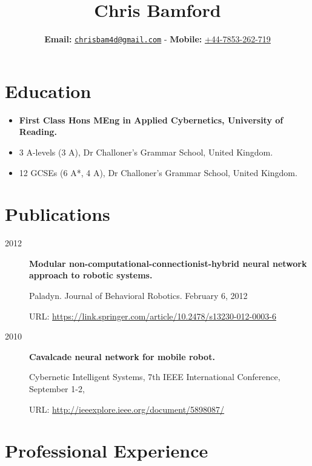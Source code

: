 \documentclass[a4paper]{article}
\title{\bfseries\Huge Chris Bamford}
\author{\textbf{Email:}
\href{mailto:chrisbam4d@gmail.com}{\nolinkurl{chrisbam4d@gmail.com}} -
\textbf{Mobile:} \href{tel:+447853262719}{+44-7853-262-719}}
\def\tightlist{}
\begin{document}
\maketitle

\section{Education}\label{education}

\begin{itemize}
\tightlist
\item
  \textbf{First Class Hons MEng in Applied Cybernetics, University of
  Reading.}
\item
  3 A-levels (3 A), Dr Challoner's Grammar School, United Kingdom.
\item
  12 GCSEs (6 A*, 4 A), Dr Challoner's Grammar School, United Kingdom.
\end{itemize}

\section{Publications}\label{publications}

\begin{description}
\tightlist
\item[2012]
\textbf{Modular non-computational-connectionist-hybrid neural network
approach to robotic systems.}

Paladyn. Journal of Behavioral Robotics. February 6, 2012

URL: \url{https://link.springer.com/article/10.2478/s13230-012-0003-6}
\item[2010]
\textbf{Cavalcade neural network for mobile robot.}

Cybernetic Intelligent Systems, 7th IEEE International Conference,
September 1-2,

URL: \url{http://ieeexplore.ieee.org/document/5898087/}
\end{description}

\section{Professional Experience}\label{professional-experience}
\end{document}
